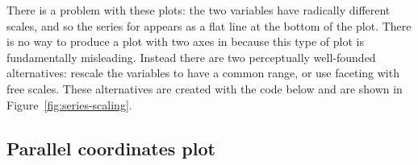 There is a problem with these plots: the two variables have radically different scales, and so the series for  appears as a flat line at the bottom of the plot. There is no way to produce a plot with two axes in \ggplot because this type of plot is fundamentally misleading. Instead there are two perceptually well-founded alternatives: rescale the variables to have a common range, or use faceting with free scales. These alternatives are created with the code below and are shown in Figure~\ref{fig:series-scaling}.  

% 


\subsection{Parallel coordinates plot} 
\label{sub:molten_data}

